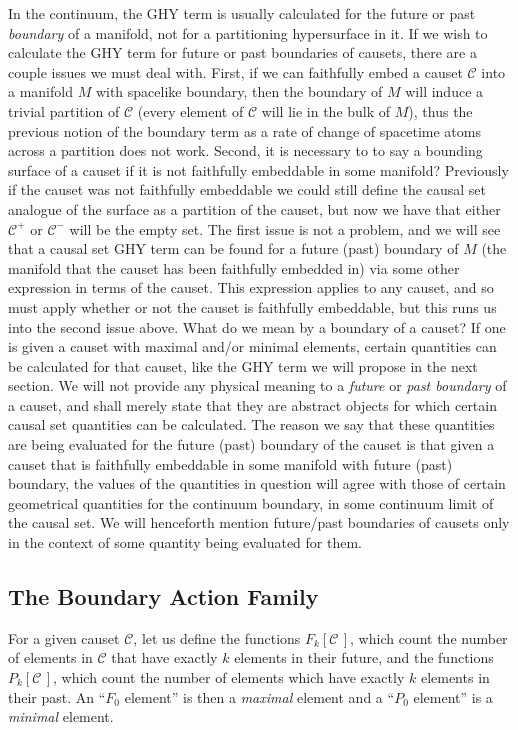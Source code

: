 \documentclass[12pt]{article}
\newcommand{\F}[1]{F_{#1}}
\renewcommand{\P}[1]{P_{#1}}
\newcommand{\mb}[1]{\marginnote{\texttt{\small MB:\,#1}}}
\begin{document}
\mb{rephrase}In the continuum, the GHY term is usually calculated for the future or past \emph{boundary} of a manifold, not for a partitioning hypersurface in it. If we wish to calculate the GHY term for future or past boundaries of causets, there are a couple issues we must deal with. First, if we can faithfully embed a causet $\mathcal{C}$ into a manifold $M$ with spacelike boundary, then the boundary of $M$ will induce a trivial partition of $\mathcal{C}$ (every element of $\mathcal{C}$ will lie in the bulk of $M$), thus the previous notion of the boundary term as a rate of change of spacetime atoms across a partition does not work. Second, it is necessary to to say a bounding surface of a causet if it is not faithfully embeddable in some manifold? Previously if the causet was not faithfully embeddable we could still define the causal set analogue of the surface as a partition of the causet, but now we have that either $\mathcal{C}^+$ or $\mathcal{C}^-$ will be the empty set. The first issue is not a problem, and we will see that a causal set GHY term can be found for a future (past) boundary of $M$ (the manifold that the causet has been faithfully embedded in) via some other expression in terms of the causet. This expression applies to any causet, and so must apply whether or not the causet is faithfully embeddable, but this runs us into the second issue above. What do we mean by a boundary of a causet? If one is given a causet with maximal and/or minimal elements, certain quantities can be calculated for that causet, like the GHY term we will propose in the next section. We will not provide any physical meaning to a \emph{future} or \emph{past boundary} of a causet, and shall merely state that they are abstract objects for which certain causal set quantities can be calculated. The reason we say that these quantities are being evaluated for the future (past) boundary of the causet is that given a causet that is faithfully embeddable in some manifold with future (past) boundary, the values of the quantities in question will agree with those of certain geometrical quantities for the continuum boundary, in some continuum limit of the causal set. We will henceforth mention future/past boundaries of causets only in the context of some quantity being evaluated for them.

\subsection{The Boundary Action Family}

For a given causet $\mathcal C$, let us define the functions $\F{k}\left[\mathcal{C}\,\right]$, which count the number of elements in $\mathcal C$ that have exactly $k$ elements in their future, and the functions $\P{k}\left[\mathcal{C}\,\right]$, which count the number of elements which have exactly $k$ elements in their past. An ``$F_0$ element'' is then a \emph{maximal} element and a ``$P_0$ element'' is a \emph{minimal} element.
\end{document}
